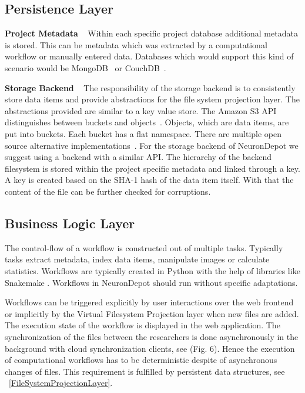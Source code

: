 \documentclass{frontiersSCNS} %
\begin{document}
\subsection{Persistence Layer}

\textbf{Project Metadata} \texttt{  } Within each specific project database
additional metadata is stored. This can be metadata which was extracted by a
computational workflow or manually entered data. Databases which would support
this kind of scenario would be MongoDB~\cite{ MongoDB} or
CouchDB~\cite{CouchDB}.

\textbf{Storage Backend} \texttt{  } The responsibility of the storage backend
is to consistently store data items and provide abstractions for the file
system projection layer. The abstractions provided are similar to a key value
store. The Amazon S3 API distinguishes between buckets and objects~\cite{
AmazonS3}. Objects, which are data items, are put into buckets. Each bucket has
a flat namespace. There are multiple open source alternative
implementations~\cite{RiakCS, OpenstackStorage}. For the storage backend of
NeuronDepot we suggest using a backend with a similar API. The hierarchy of the
backend filesystem is stored within the project specific metadata and linked
through a key. A key is created based on the SHA-1 hash of the data item
itself. With that the content of the file can be further checked for
corruptions.


\subsection{Business Logic Layer}

The control-flow of a workflow is constructed out of multiple tasks. Typically
tasks extract metadata, index data items, manipulate images or calculate
statistics. Workflows are typically created in Python with the help of
libraries like Snakemake \citep{Koester2012}. Workflows in NeuronDepot should run
without specific adaptations.

Workflows can be triggered explicitly by user interactions over the web
frontend or implicitly by the Virtual Filesystem Projection layer when new
files are added. The execution state of the workflow is displayed in the web
application. The synchronization of the files between the researchers is done
asynchronously in the background with cloud synchronization clients, see (Fig.
6). Hence the execution of computational workflows  has to be deterministic
despite of asynchronous changes of files. This requirement is fulfilled by
persistent data structures, see ~\ref{FileSystemProjectionLayer}.
\end{document}
